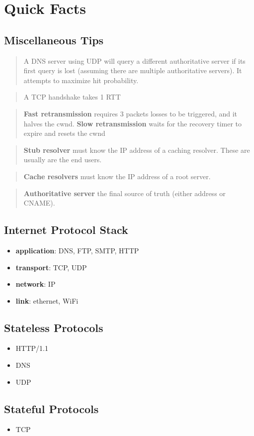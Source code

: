 \section{Quick Facts}
\subsection*{Miscellaneous Tips}
\footnotesize
\blockquote{A DNS server using UDP will query a different authoritative
server if its first query is lost (assuming there are multiple
authoritative servers). It attempts to maximize hit probability.}

\blockquote{A TCP handshake takes 1 RTT}

\blockquote{\textbf{Fast retransmission} requires 3 packets losses to be
triggered, and it halves the cwnd. \textbf{Slow retransmission} waits
for the recovery timer to expire and resets the cwnd}

\blockquote{\textbf{Stub resolver} must know the IP address of a caching
resolver. These are usually are the end users.}

\blockquote{\textbf{Cache resolvers} must know the IP address of a root
server.}

\blockquote{\textbf{Authoritative server} the final source of truth
(either address or CNAME).}

\small
\subsection*{Internet Protocol Stack}
\begin{itemize}[itemsep=0em]
  \item \textbf{application}: DNS, FTP, SMTP, HTTP
  \item \textbf{transport}: TCP, UDP
  \item \textbf{network}: IP
  \item \textbf{link}: ethernet, WiFi
\end{itemize}
\subsection*{Stateless Protocols}
\begin{itemize}[itemsep=0em]
  \item HTTP/1.1
  \item DNS
  \item UDP
\end{itemize}
\subsection*{Stateful Protocols}
\begin{itemize}[itemsep=0em]
  \item TCP
\end{itemize}
